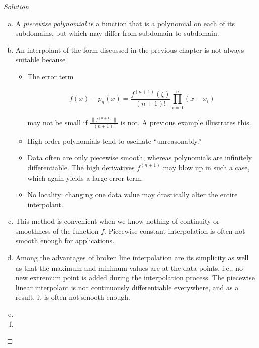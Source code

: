 \documentclass[12pt,a4]{article}
\theoremstyle{definition}
\begin{document}
\begin{proof}[Solution]
	\begin{enumerate}[(a)]
		\item A \emph{piecewise polynomial} is a function that is a polynomial on each of its subdomains, but which may differ from subdomain to subdomain. 
		
		\item An interpolant of the form discussed in the previous chapter is not always suitable because 
		
		\begin{itemize}
			\item The error term 
			
			\[
			f(x) - p_n(x) = \frac{f^{(n + 1)} (\xi)}{(n + 1)!} \prod_{i = 0}^n (x - x_i)
			\]
			
			may not be small if $\frac{\| f^{(n + 1)} \|}{(n + 1)!}$ is not. A previous example illustrates this.
			
			\item High order polynomials tend to oscillate ``unreasonably.''
			
			\item Data often are only piecewise smooth, whereas polynomials are infinitely differentiable. The high derivatives $f^{(n + 1)}$ may blow up in such a case, which again yields a large error term. 
			
			\item No locality: changing one data value may drastically alter the entire interpolant. 
		\end{itemize}
		
		\item This method is convenient when we know nothing of continuity or smoothness of the function $f$. Piecewise constant interpolation is often not smooth enough for applications. 
		
		\item Among the advantages of broken line interpolation are its simplicity as well as that the maximum and minimum values are at the data points, i.e., no new extremum point is added during the interpolation process. The piecewise linear interpolant is not continuously differentiable everywhere, and as a result, it is often not smooth enough. 
		
		\item 
		
		\item 
		

\end{enumerate}
\end{proof}
\end{document}
